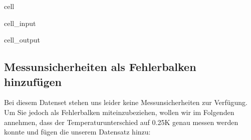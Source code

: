 \documentclass[letterpaper,10pt,english]{jupyterBook}
\begin{document}
\begin{sphinxuseclass}{cell}
\begin{sphinxVerbatimInput}
\begin{sphinxuseclass}{cell_input}
\end{sphinxuseclass}\end{sphinxVerbatimInput}
\begin{sphinxVerbatimOutput}

\begin{sphinxuseclass}{cell_output}
\noindent{}

\end{sphinxuseclass}\end{sphinxVerbatimOutput}

\end{sphinxuseclass}

\subsection{Messunsicherheiten als Fehlerbalken hinzufügen}
\label{\detokenize{content/T_Plotten:messunsicherheiten-als-fehlerbalken-hinzufugen}}
\sphinxAtStartPar
Bei diesem Datenset stehen uns leider keine Messunsicherheiten zur Verfügung. Um Sie jedoch als Fehlerbalken miteinzubeziehen, wollen wir im Folgenden annehmen, dass der Temperaturunterschied auf 0.25K genau messen werden konnte und fügen die unserem Datensatz hinzu:
\end{document}
